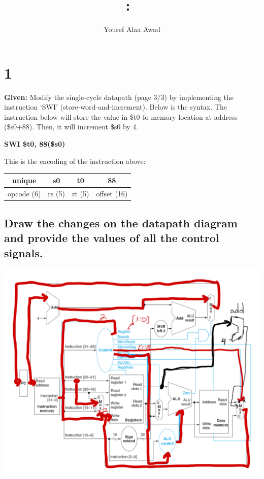 \documentclass{article}
\title{
    \vspace{2in}
    \textmd{\textbf{\hmwkClass:\ \hmwkTitle}}\\
    \normalsize\vspace{0.1in}
    \vspace{3in}
}
\author{Yousef Alaa Awad}
\begin{document}
\maketitle
\pagebreak

\section{1}
\textbf{Given:} Modify the single-cycle datapath (page 3/3) by implementing the instruction ‘SWI’ (store-word-and-increment). Below is the syntax. The instruction below will store the value in \$t0 to memory location at address (\$s0+88). Then, it will increment \$s0 by 4.
\begin{center}
  \textbf{SWI \$t0, 88(\$s0)}
\end{center}
This is the encoding of the instruction above:
\begin{center}
  \begin{tabular}{|c|c|c|c|}
    \hline
    unique & s0 & t0 & 88 \\
    \hline\hline
    opcode (6) & rs (5) & rt (5) & offset (16) \\
    \hline
  \end{tabular}
\end{center}

\subsection{Draw the changes on the datapath diagram and provide the values of all the control signals.}
\includegraphics[width=\textwidth]{q1.png}
\end{document}
